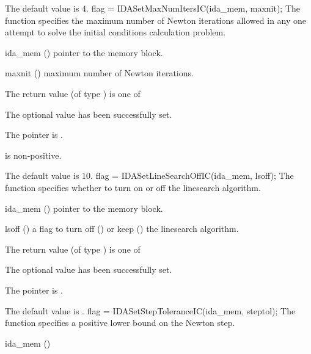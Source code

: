 {{\begin{args}
  \end{args}
}
{
  The default value is $4$.
}
{
flag = IDASetMaxNumItersIC(ida\_mem, maxnit);
}
{
  The function  specifies the maximum
  number of Newton iterations allowed in any one attempt to solve
  the initial conditions calculation problem.
}
{
  \begin{args}
  \item[ida\_mem] ()
    pointer to the {\ida} memory block.
  \item[maxnit] ()
    maximum number of Newton iterations.
  \end{args}
}
{
  The return value  (of type ) is one of
  \begin{args}
  \item[\Id{IDA\_SUCCESS}] 
    The optional value has been successfully set.
  \item[\Id{IDA\_MEM\_NULL}]
    The  pointer is .
  \item[\Id{IDA\_ILL\_INPUT}]
     is non-positive.
  \end{args}
}
{
  The default value is $10$.
}
{
flag = IDASetLineSearchOffIC(ida\_mem, lsoff);
}
{
  The function  specifies whether to turn
  on or off the linesearch algorithm.
}
{
  \begin{args}
  \item[ida\_mem] ()
    pointer to the {\ida} memory block.
  \item[lsoff] ()
    a flag to turn off () or keep () the linesearch
    algorithm.
  \end{args}
}
{
  The return value  (of type ) is one of
  \begin{args}
  \item[\Id{IDA\_SUCCESS}] 
    The optional value has been successfully set.
  \item[\Id{IDA\_MEM\_NULL}]
    The  pointer is .
  \end{args}
}
{
  The default value is .
}
{
flag = IDASetStepToleranceIC(ida\_mem, steptol);
}
{
  The function  specifies a positive lower bound
  on the Newton step.
}
{
  \begin{args}
  \item[ida\_mem] ()

\end{args}}}
